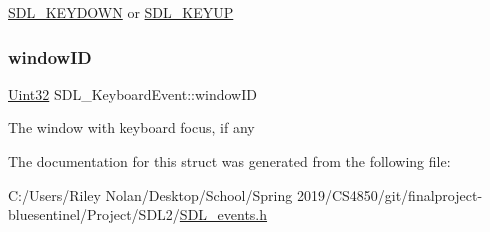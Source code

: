 \mbox{\hyperlink{_s_d_l__events_8h_a3b589e89be6b35c02e0dd34a55f3fccaacaf8cfd53c985cdbf6a90c811d51a1fc}{S\+D\+L\+\_\+\+K\+E\+Y\+D\+O\+WN}} or \mbox{\hyperlink{_s_d_l__events_8h_a3b589e89be6b35c02e0dd34a55f3fccaadefb8866b9d28be21c2c33c35cc66c4b}{S\+D\+L\+\_\+\+K\+E\+Y\+UP}} \mbox{\label{struct_s_d_l___keyboard_event_a56efb6780b96acd5b50d8f797efb3546}} 
\subsubsection{\texorpdfstring{windowID}{windowID}}
{\footnotesize\ttfamily \mbox{\hyperlink{_s_d_l__stdinc_8h_add440eff171ea5f55cb00c4a9ab8672d}{Uint32}} S\+D\+L\+\_\+\+Keyboard\+Event\+::window\+ID}

The window with keyboard focus, if any 

The documentation for this struct was generated from the following file\+:\begin{DoxyCompactItemize}
\item 
C\+:/\+Users/\+Riley Nolan/\+Desktop/\+School/\+Spring 2019/\+C\+S4850/git/finalproject-\/bluesentinel/\+Project/\+S\+D\+L2/\mbox{\hyperlink{_s_d_l__events_8h}{S\+D\+L\+\_\+events.\+h}}\end{DoxyCompactItemize}
